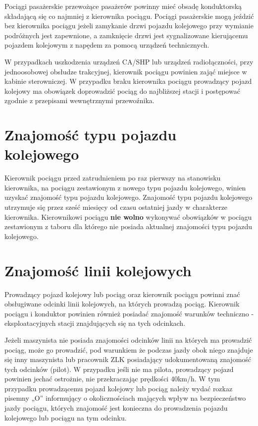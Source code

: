 Pociągi pasażerskie przewożące pasażerów powinny mieć obsadę konduktorską składającą się co najmniej z kierownika pociągu. Pociągi pasażerskie mogą jeździć bez kierownika pociągu jeżeli zamykanie drzwi pojazdu kolejowego przy wymianie podróżnych jest zapewnione, a zamknięcie drzwi jest sygnalizowane kierującemu pojazdem kolejowym z napędem za pomocą urządzeń technicznych. 

W przypadkach uszkodzenia urządzeń CA/SHP lub urządzeń radiołączności, przy jednoosobowej obsłudze trakcyjnej, kierownik pociągu powinien zająć miejsce w kabinie sterowniczej. W przypadku braku kierownika pociągu prowadzący pojazd kolejowy ma obowiązek doprowadzić pociąg do najbliższej stacji i postępować zgodnie z przepisami wewnętrznymi przewoźnika. 

\section{Znajomość typu pojazdu kolejowego}

Kierownik pociągu przed zatrudnieniem po raz pierwszy na stanowisku kierownika, na pociągu zestawionym z nowego typu pojazdu kolejowego, winien uzyskać znajomość typu pojazdu kolejowego. Znajomość typu pojazdu kolejowego utrzymuje się przez sześć miesięcy od czasu ostatniej jazdy w charakterze kierownika. Kierownikowi pociągu \textbf{nie wolno} wykonywać obowiązków w pociągu zestawionym z taboru dla którego nie posiada aktualnej znajomości typu pojazdu kolejowego. 

\section{Znajomość linii kolejowych}

Prowadzący pojazd kolejowy lub pociąg oraz kierownik pociągu powinni znać obsługiwane odcinki linii kolejowych, na których prowadzą pociąg. Kierownik pociągu i konduktor powinien również posiadać znajomość warunków techniczno - eksploatacyjnych stacji znajdujących się na tych odcinkach. 

Jeżeli maszynista nie posiada znajomości odcinków linii na których ma prowadzić pociąg, może go prowadzić, pod warunkiem że podczas jazdy obok niego znajduje się inny maszynista lub pracownik ZLK posiadający udokumentowaną znajomość tych
odcinków (pilot). W przypadku jeśli nie ma pilota, prowadzący pojazd powinien jechać ostrożnie, nie przekraczając prędkości 40km/h. W tym przypadku prowadzącemu pojazd kolejowy lub pociąg należy wydać rozkaz pisemny „O” informujący o okolicznościach mających wpływ na bezpieczeństwo jazdy pociągu, których znajomość jest konieczna do prowadzenia pojazdu kolejowego lub pociągu na tym odcinku.


